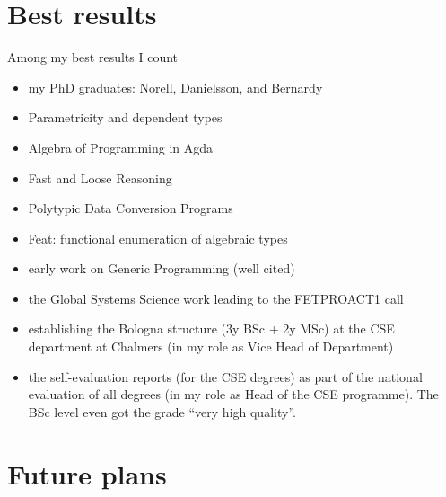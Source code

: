 \documentclass[11pt,twoside,twocolumn]{article}
\begin{document}
\section{Best results}
Among my best results I count
\begin{itemize}
\item my PhD graduates: Norell, Danielsson, and Bernardy
\item Parametricity and dependent types \citep{bernardy_parametricity_2010}
\item Algebra of Programming in Agda \citep{MuKoJansson2009AoPA}
\item Fast and Loose Reasoning \citep{danielssonetal06:fastandloose}
\item Polytypic Data Conversion Programs \citep{janssonjeuring-dataconv}
\item Feat: functional enumeration of algebraic types \citep{duregardHaskell12Feat}
\item early work on Generic Programming \citep{backhouseetal98, janssonjeuring1997a} (well cited)
\item the Global Systems Science work \cite{jaeger13:GSSshort} leading to the FETPROACT1 call
\item establishing the Bologna structure (3y BSc + 2y MSc) at the CSE
  department at Chalmers (in my role as Vice Head of Department)
\item the self-evaluation reports (for the CSE degrees) as part of the
  national evaluation of all degrees (in my role as Head of the CSE
  programme). The BSc level even got the grade ``very high quality''.
\end{itemize}

\newpage
\section{Future plans}
\end{document}
